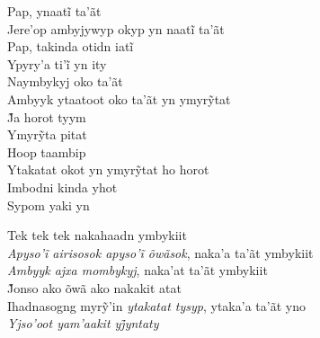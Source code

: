 \begin{linenumbers}\begingroup\raggedright

\noindent   Pap, ynaatĩ ta’ãt\\
  Jere’op ambyjywyp okyp yn naatĩ ta’ãt\\
  Pap, takinda otidn iatĩ\\
  Ypyry’a ti’ĩ yn ity\\
  Naymbykyj oko ta'ãt\\
  Ambyyk ytaatoot oko ta’ãt yn ymyrỹtat\\
  J̃a horot tyym\\
  Ymyrỹta pitat\\
  Hoop taambip\\
  Ytakatat okot yn ymyrỹtat ho horot\\
  Imbodni kinda yhot\\
  Sypom yaki yn

\end{linenumbers}\endgroup

\bigskip

\begin{linenumbers}\begingroup\raggedright

\noindent   Tek tek tek nakahaadn ymbykiit\\
  \emph{Apyso’ĩ airisosok apyso’ĩ õwãsok}, naka’a ta’ãt ymbykiit\\
  \emph{Ambyyk ajxa mombykyj}, naka'at ta'ãt ymbykiit\\
  J̃onso ako õwã ako nakakit atat\\
  Ihadnasogng myrỹ’in \emph{ytakatat tysyp}, ytaka’a ta’ãt yno\\
  \emph{Yjso’oot yam’aakit yj̃yntaty}

\end{linenumbers}\endgroup

